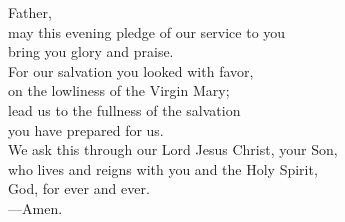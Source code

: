 \prayer


\begin{prayerverse}
Father,\\
may this evening pledge of our service to you\\
bring you glory and praise.\\
For our salvation you looked with favor,\\
on the lowliness of the Virgin Mary;\\
lead us to the fullness of the salvation\\
you have prepared for us.\\
We ask this through our Lord Jesus Christ, your Son,\\
who lives and reigns with you and the Holy Spirit,\\
God, for ever and ever.\\
{\color{red}---\thinspace}Amen.
\end{prayerverse}

